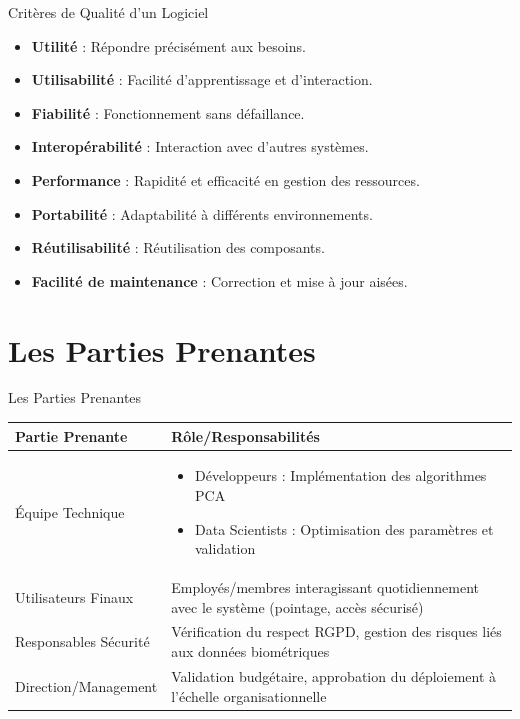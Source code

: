 \documentclass{beamer}
\begin{document}
\begin{frame}{Critères de Qualité d’un Logiciel}
    \begin{itemize}
        \item \textbf{Utilité} : Répondre précisément aux besoins.
        \item \textbf{Utilisabilité} : Facilité d'apprentissage et d'interaction.
        \item \textbf{Fiabilité} : Fonctionnement sans défaillance.
        \item \textbf{Interopérabilité} : Interaction avec d'autres systèmes.
        \item \textbf{Performance} : Rapidité et efficacité en gestion des ressources.
        \item \textbf{Portabilité} : Adaptabilité à différents environnements.
        \item \textbf{Réutilisabilité} : Réutilisation des composants.
        \item \textbf{Facilité de maintenance} : Correction et mise à jour aisées.
    \end{itemize}
\end{frame}

\section{Les Parties Prenantes}
\begin{frame}{Les Parties Prenantes}

    \begin{center}
    \begin{tabular}{|p{5cm}|p{6cm}|}
    \hline
    \textbf{Partie Prenante} & \textbf{Rôle/Responsabilités} \\
    \hline
    Équipe Technique & 
    \begin{itemize}
        \item Développeurs : Implémentation des algorithmes PCA
        \item Data Scientists : Optimisation des paramètres et validation
    \end{itemize} \\
    \hline
    Utilisateurs Finaux & 
    Employés/membres interagissant quotidiennement avec le système (pointage, accès sécurisé) \\
    \hline
    Responsables Sécurité & 
    Vérification du respect RGPD, gestion des risques liés aux données biométriques \\
    \hline
    Direction/Management & 
    Validation budgétaire, approbation du déploiement à l'échelle organisationnelle \\
    
    \hline
    \end{tabular}
\end{center}
    
\end{frame}
\end{document}
